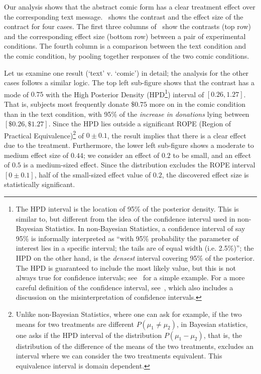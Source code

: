  

Our analysis shows that the abstract comic form has a clear treatment effect over the corresponding text message.~ shows the contrast and the effect size of the contract for four cases. The first three columns of~ show the contrasts (top row) and the corresponding effect size (bottom row) between a pair of experimental conditions. The fourth column is a comparison between the text condition and the comic condition, by pooling together responses of the two comic conditions.

Let us examine one result (`text' v. `comic') in detail; the analysis for the other cases follows a similar logic. The top left sub-figure shows that the contrast has a mode of $0.75$ with the High Posterior Density (HPD\footnote{The HPD interval is the location of 95\% of the posterior density. This is similar to, but different from the idea of the confidence interval used in non-Bayesian Statistics. In non-Bayesian Statistics, a confidence interval of say 95\% is informally interpreted as ``with 95\% probability the parameter of interest lies in a specific interval; the tails are of equal width (i.e. 2.5\%)''; the HPD on the other hand, is the \textit{densest} interval covering 95\% of the posterior. The HPD is guaranteed to include the most likely value, but this is not always true for confidence intervals; see~\textcite[][p. 57]{McElreath2015} for a simple example. For a more careful definition of the confidence interval, see~\textcite{Hoekstra2014}, which also includes a discussion on the misinterpretation of confidence intervals.}) interval of $[0.26, 1.27]$. That is, subjects most frequently donate $\$0.75$ more on in the comic condition than in the text condition, with 95\% of the \textit{increase in donations} lying between $[\$0.26, \$1.27]$. Since the HPD lies outside a significant ROPE (Region of Practical Equivalence)\footnote{Unlike non-Bayesian Statistics, where one can ask for example, if the two means for two treatments are different $P(\mu_1\neq \mu_2)$, in Bayesian statistics, one asks if the HPD interval of the distribution $P(\mu_1-\mu_2)$, that is, the distribution of the difference of the means of the two treatments, excludes an interval where we can consider the two treatments equivalent. This equivalence interval is domain dependent. } of $0 \pm 0.1$, the result implies that there is a clear effect due to the treatment. Furthermore, the lower left sub-figure shows a moderate to medium effect size of $0.44$; we consider an effect of $0.2$ to be small, and an effect of $0.5$ is a medium-sized effect. Since the distribution excludes the ROPE interval $[0 \pm 0.1]$, half of the small-sized effect value of $0.2$, the discovered effect size is statistically significant. 

